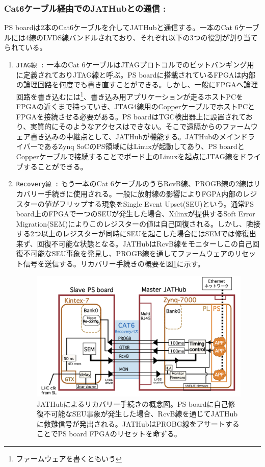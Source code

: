 \subsubsection{Cat6ケーブル経由でのJATHubとの通信 :}\par
 PS boardは2本のCat6ケーブルを介してJATHubと通信する。一本のCat 6ケーブルには4線のLVDS線バンドルされており、それぞれ以下の3つの役割が割り当てられている。

\begin{enumerate}
    \item \texttt{JTAG線 :} 一本のCat 6ケーブルはJTAGプロトコルでのビットバンギング用に定義されておりJTAG線と呼ぶ。PS boardに搭載されているFPGAは内部の論理回路を何度でも書き直すことができる。しかし、一般にFPGAへ論理回路を書き込むには\footnote{ファームウェアを書くともいう}、書き込み用アプリケーションが走るホストPCをFPGAの近くまで持っていき、JTAG4線用のCopperケーブルでホストPCとFPGAを接続させる必要がある。PS boardはTGC検出器上に設置されており、実質的にそのようなアクセスはできない。そこで遠隔からのファームウェア書き込みの中継点として、JATHubが機能する。JATHubのメインドライバーであるZynq SoCのPS領域にはLinuxが起動してあり、PS boardとCopperケーブルで接続することでボード上のLinuxを起点にJTAG線をドライブすることができる。
    \baselineskip


    \item \texttt{Recovery線 :} もう一本のCat 6ケーブルのうちRcvB線、PROGB線の2線はリカバリー手続きに使用される。一般に放射線の影響によりFGPA内部のレジスターの値がフリップする現象をSingle Event Upset(SEU)という。通常PS board上のFPGAで一つのSEUが発生した場合、Xilinxが提供するSoft Error Migration(SEM)によりこのレジスターの値は自己回復される。しかし、隣接する2つ以上のレジスターが同時にSEUを起こした場合にはSEMでは修復出来ず、回復不可能な状態となる。JATHubはRcvB線をモニターしこの自己回復不可能なSEU事象を発見し、PROGB線を通してファームウェアのリセット信号を送信する。リカバリー手続きの概要を図\ref{JATHubsem}に示す。
    \baselineskip
    \begin{figure} 
    \centering
    \includegraphics[width=16cm]{fig/QAQC/JATHubsem.png}
    \caption[JATHubによるリカバリー手続き]{JATHubによるリカバリー手続きの概念図。PS boardに自己修復不可能なSEU事象が発生した場合、RcvB線を通じてJATHubに救難信号が発出される。JATHubはPROBG線をアサートすることでPS board FPGAのリセットを命ずる。}
    \label{JATHubsem}
    \end{figure}
    

\end{enumerate}
